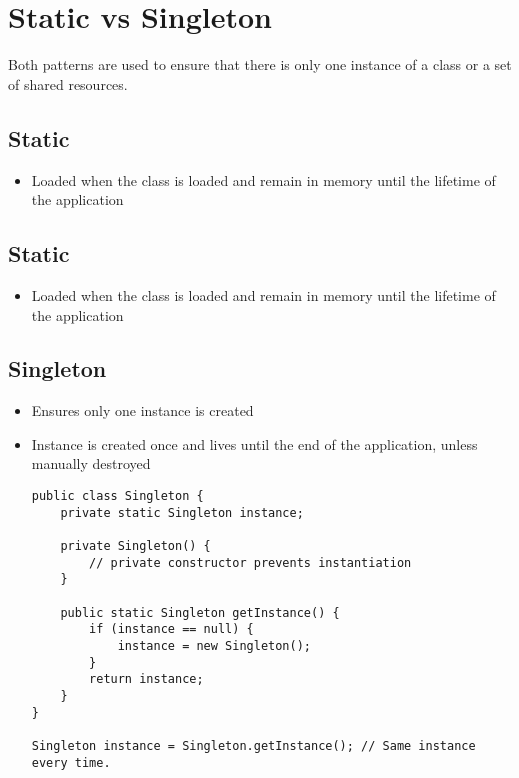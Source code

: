 \chapter{Static vs Singleton}

Both patterns are used to ensure that there is only one instance of a class or a set of shared resources.

\section{Static}
\begin{itemize}
    \item Loaded when the class is loaded and remain in memory until the lifetime of the application
\end{itemize}

\section{Static}
\begin{itemize}
    \item Loaded when the class is loaded and remain in memory until the lifetime of the application
\end{itemize}

\section{Singleton}
\begin{itemize}
    \item Ensures only one instance is created
    \item Instance is created once and lives until the end of the application, unless manually destroyed

    \begin{lstlisting}
public class Singleton {
    private static Singleton instance;
    
    private Singleton() {
        // private constructor prevents instantiation
    }
    
    public static Singleton getInstance() {
        if (instance == null) {
            instance = new Singleton();
        }
        return instance;
    }
}

Singleton instance = Singleton.getInstance(); // Same instance every time.

    \end{lstlisting}
\end{itemize}